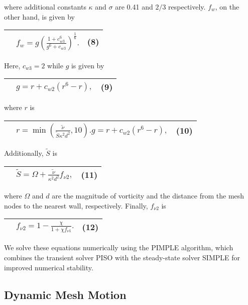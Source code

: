\documentclass[]{article}
\begin{document}
where additional constants \(\kappa\) and \(\sigma\) are 0.41 and
\(2/3\) respectively. \(f_{w}\), on the other hand, is given by

\begin{longtable}[]{@{}lll@{}}
\toprule
&
\(f_{w} = g\left( \frac{1 + c_{w3}^{6}}{g^{6} + c_{w3}} \right)^{\frac{1}{6}}.\)
& (8)\tabularnewline
\midrule
\endhead
\bottomrule
\end{longtable}

Here, \(c_{w3} = 2\) while \(g\) is given by

\begin{longtable}[]{@{}lll@{}}
\toprule
& \(g = r + c_{w2}\left( r^{6} - r \right),\) & (9)\tabularnewline
\midrule
\endhead
\bottomrule
\end{longtable}

where \(r\) is

\begin{longtable}[]{@{}lll@{}}
\toprule
&
\(r = \min\left( \frac{\tilde{\nu}}{\tilde{S}\kappa^{2}d^{2}},10 \right).g = r + c_{w2}\left( r^{6} - r \right),\)
& (10)\tabularnewline
\midrule
\endhead
\bottomrule
\end{longtable}

Additionally, \(\tilde{S}\) is

\begin{longtable}[]{@{}lll@{}}
\toprule
& \(\tilde{S} = \Omega + \frac{\tilde{\nu}}{\kappa^{2}d^{2}}f_{\nu 2},\)
& (11)\tabularnewline
\midrule
\endhead
\bottomrule
\end{longtable}

where \(\Omega\) and \(d\) are the magnitude of vorticity and the
distance from the mesh nodes to the nearest wall, respectively. Finally,
\(f_{\nu 2}\) is

\begin{longtable}[]{@{}lll@{}}
\toprule
& \(f_{\nu 2} = 1 - \frac{\chi}{1 + \chi f_{\nu 1}}.\) &
(12)\tabularnewline
\midrule
\endhead
\bottomrule
\end{longtable}

We solve these equations numerically using the PIMPLE algorithm, which
combines the transient solver PISO with the steady-state solver SIMPLE
for improved numerical stability.

\hypertarget{dynamic-mesh-motion}{\subsection{Dynamic Mesh
Motion}\label{dynamic-mesh-motion}}
\end{document}
